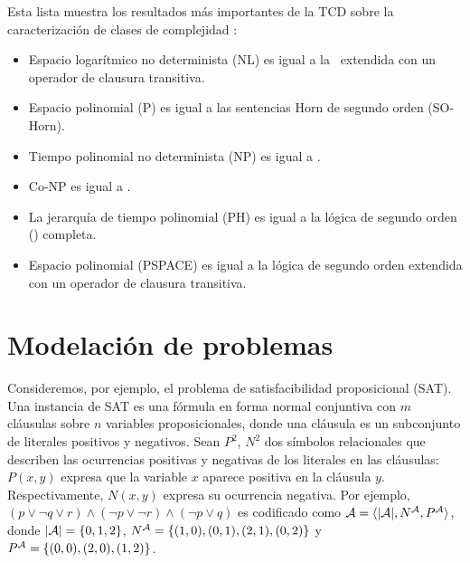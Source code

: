 Esta lista muestra los resultados más importantes de la TCD sobre la
caracterización de clases de complejidad \cite{immerman:book}:
\begin{itemize}
\item Espacio logarítmico no determinista (NL) es igual a la \LPO\ extendida con
un operador de clausura transitiva.
\item Espacio polinomial (P) es igual a las sentencias Horn de segundo orden
(SO-Horn).
\item Tiempo polinomial no determinista (NP) es igual a \SOE.
\item Co-NP es igual a \SOA.
\item La jerarquía de tiempo polinomial (PH) es igual a la lógica 
de segundo orden (\LSO) completa.
\item Espacio polinomial (PSPACE) es igual a la lógica de segundo orden
extendida con un operador de clausura transitiva.
\end{itemize}


\section{Modelación de problemas}
Consideremos, por ejemplo, el problema de satisfacibilidad
proposicional (SAT). Una instancia de SAT es una fórmula en forma normal
conjuntiva con $m$ cláusulas sobre $n$ variables proposicionales, donde una
cláusula es un subconjunto de literales positivos y negativos. 
Sean $P^2$, $N^2$ dos símbolos relacionales que describen las ocurrencias
positivas y negativas de los literales en las cláusulas: $P(x, y)$ expresa que
la variable $x$ aparece positiva en la cláusula $y$. Respectivamente, $N(x, y)$ expresa
su ocurrencia negativa.
Por ejemplo, $(p\lor \neg q\lor r)\land(\neg p\lor \neg r)\land(\neg p\lor q)$
es codificado como $\mathcal{A}=\langle |\mathcal{A}|,N^{\mathcal{A}},P^{\mathcal{A}} \rangle$, donde $|\mathcal{A}|=\{0,1,2\}$,
$N^{\mathcal{A}}=\{(1,0),(0,1),(2,1),(0,2)\}$ y $P^{\mathcal{A}}=\{(0,0),(2,0),(1,2)\}$.

%


